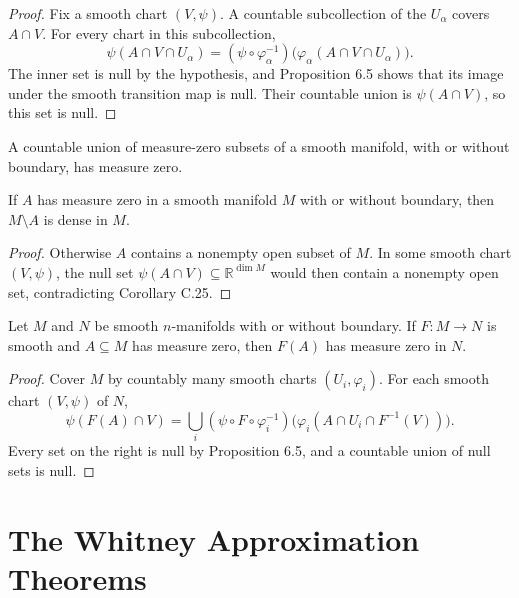 \begin{proof}
\leanok
\sketch Fix a smooth chart $(V,\psi)$. A countable subcollection of the $U_\alpha$ covers $A\cap V$. For every chart in this subcollection,
\[
\psi(A\cap V\cap U_\alpha)
=(\psi\circ\varphi_\alpha^{-1})
\bigl(\varphi_\alpha(A\cap V\cap U_\alpha)\bigr).
\]
The inner set is null by the hypothesis, and Proposition 6.5 shows that its image under the smooth transition map is null. Their countable union is $\psi(A\cap V)$, so this set is null.
\end{proof}

\begin{proposition}
\label{exer:6-7}
\leanok
{}
A countable union of measure-zero subsets of a smooth manifold, with or
without boundary, has measure zero.
\end{proposition}

\begin{proposition}
\label{prop:6-8}
\leanok
{}
If $A$ has measure zero in a smooth manifold $M$ with or without boundary, then $M\setminus A$ is dense in $M$.
\end{proposition}

\begin{proof}
\leanok
\sketch Otherwise $A$ contains a nonempty open subset of $M$. In some smooth chart $(V,\psi)$, the null set $\psi(A\cap V)\subseteq\mathbb{R}^{\dim M}$ would then contain a nonempty open set, contradicting Corollary C.25.
\end{proof}

\begin{theorem}
\label{thm:6-9}
\leanok
{}
Let $M$ and $N$ be smooth $n$-manifolds with or without boundary. If $F:M\to N$ is smooth and $A\subseteq M$ has measure zero, then $F(A)$ has measure zero in $N$.
\end{theorem}

\begin{proof}
\leanok
\sketch Cover $M$ by countably many smooth charts $(U_i,\varphi_i)$. For each smooth chart $(V,\psi)$ of $N$,
\[
\psi(F(A)\cap V)
=\bigcup_i(\psi\circ F\circ\varphi_i^{-1})
\bigl(\varphi_i(A\cap U_i\cap F^{-1}(V))\bigr).
\]
Every set on the right is null by Proposition 6.5, and a countable union of null sets is null.
\end{proof}


\section{The Whitney Approximation Theorems}

